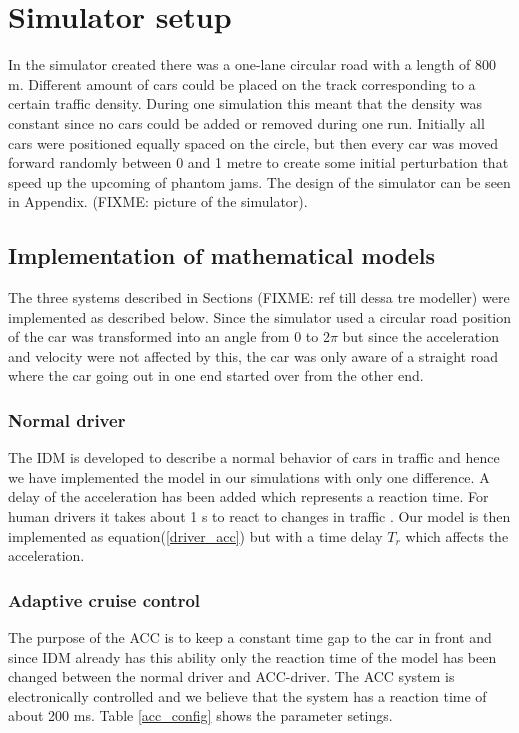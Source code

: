 \section{Simulator setup}
In the simulator created there was a one-lane circular road with a length of
800 m. Different amount of cars could be placed on the track corresponding to
a certain traffic density. During one simulation this meant that the density
was constant since no cars could be added or removed during one run. Initially
all cars were positioned equally spaced on the circle, but then every car
was moved forward randomly between 0 and 1 metre to create some initial
perturbation that speed up the upcoming of phantom jams. The design of the
simulator can be seen in Appendix. (FIXME: picture of the simulator).

\subsection{Implementation of mathematical models}
The three systems described in Sections (FIXME: ref till dessa tre modeller)
were implemented as described below. Since the simulator used a circular road
position of the car was transformed into an angle from 0 to 2\begin{math}\pi
\end{math} but since the acceleration and velocity were not affected by this,
the car was only aware of a straight road where the car going out in one
end started over from the other end.

\subsubsection {Normal driver}
The IDM is developed to describe a normal behavior of cars in traffic
and hence we have implemented the model in our simulations with only one
difference. A delay of the acceleration has been added which represents a
reaction time. For human drivers it takes about 1 s to react to changes in
traffic \cite{idm}. Our model is then implemented as equation(\ref{driver_acc})
but with a time delay \begin{math}T_r\end{math} which affects the acceleration.

\subsubsection {Adaptive cruise control }
The purpose of the ACC is to keep a constant time gap to the car in front
and since IDM already has this ability only the reaction time of the model
has been changed between the normal driver and ACC-driver. The ACC system
is electronically controlled and we believe that the system has a reaction
time of about 200 ms. Table \ref{acc_config} shows the parameter setings.


